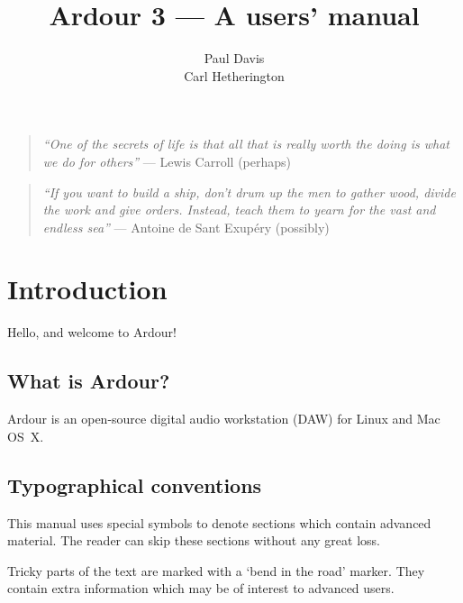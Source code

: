 \documentclass[10pt,a4paper]{book}
\title{Ardour 3 --- A users' manual}
\author{Paul Davis\\Carl Hetherington}
\date{}
\begin{document}
\maketitle


\clearpage
\thispagestyle{empty}

\bigskip
\bigskip
\bigskip

\begin{quote}
\emph{``One of the secrets of life is that all that is really worth the doing is what we do for others''} --- Lewis Carroll (perhaps)
\end{quote}

\bigskip
\bigskip
\bigskip

\begin{quote}
\emph{``If you want to build a ship, don't drum up the men to gather wood, divide the work and give orders.  Instead, teach them to yearn for the vast and endless sea''} --- Antoine de Sant Exup\'ery (possibly)
\end{quote}

\bigskip

\tableofcontents



\chapter{Introduction}

Hello, and welcome to Ardour!

\section{What is Ardour?}

Ardour is an open-source digital audio workstation (DAW) for Linux and
Mac OS~X.

\section{Typographical conventions}

This manual uses special symbols to denote sections which contain
advanced material.  The reader can skip these sections without any
great loss.

\begin{danger}
Tricky parts of the text are marked with a `bend in the road' marker.
They contain extra information which may be of interest to advanced
users.
\end{danger}
\end{document}
